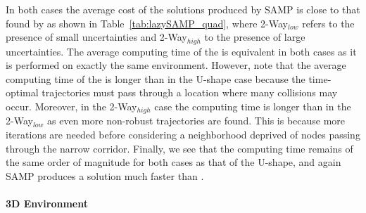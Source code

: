 In both cases the average cost of the solutions produced by SAMP is close to that found by  as shown in Table~\ref{tab:lazySAMP_quad}, where 2-Way$_{low}$ refers to the presence of small uncertainties and 2-Way$_{high}$ to the presence of large uncertainties.
The average computing time of the  is equivalent in both cases as it is performed on exactly the same environment.
However, note that the average computing time of the  is longer than in the U-shape case because the time-optimal trajectories must pass through a location where many collisions may occur. 
Moreover, in the 2-Way$_{high}$ case the  computing time is longer than in the 2-Way$_{low}$ as even more non-robust trajectories are found.
This is because more iterations are needed before considering a neighborhood deprived of nodes passing through the narrow corridor.
Finally, we see that the  computing time remains of the same order of magnitude for both cases as that of the U-shape, and again SAMP produces a solution much faster than .

\paragraph{3D Environment} 


